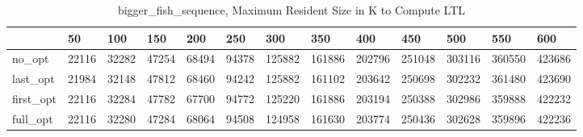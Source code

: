 \begin{table}
\caption{bigger\_fish\_sequence, Maximum Resident Size in K to Compute LTL}
\label{bigger_fish_sequence_LTL_size}
\begin{tabular}{lllllllllllll}
\toprule
 & 50 & 100 & 150 & 200 & 250 & 300 & 350 & 400 & 450 & 500 & 550 & 600 \\
\midrule
no\_opt & 22116 & 32282 & 47254 & 68494 & 94378 & 125882 & 161886 & 202796 & 251048 & 303116 & 360550 & 423686 \\
last\_opt & 21984 & 32148 & 47812 & 68460 & 94242 & 125882 & 161102 & 203642 & 250698 & 302232 & 361480 & 423690 \\
first\_opt & 22116 & 32284 & 47782 & 67700 & 94772 & 125220 & 161886 & 203194 & 250388 & 302986 & 359888 & 422232 \\
full\_opt & 22116 & 32280 & 47284 & 68064 & 94508 & 124958 & 161630 & 203774 & 250436 & 302628 & 359896 & 422236 \\
\bottomrule
\end{tabular}
\end{table}
